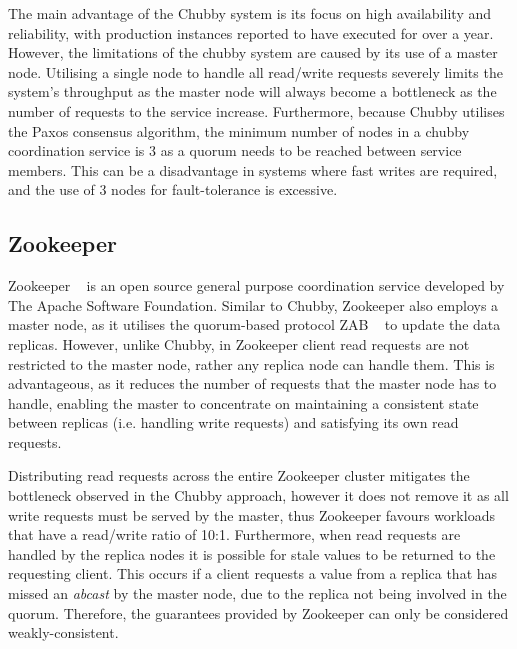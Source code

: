 The main advantage of the Chubby system is its focus on high availability and reliability, with production instances reported to have executed for over a year. However, the limitations of the chubby system are caused by its use of a master node. Utilising a single node to handle all read/write requests severely limits the system's throughput as the master node will always become a bottleneck as the number of requests to the service increase.  Furthermore, because Chubby utilises the Paxos consensus algorithm, the minimum number of nodes in a chubby coordination service is 3 as a quorum needs to be reached between service members.  This can be a disadvantage in systems where fast writes are required, and the use of 3 nodes for fault-tolerance is excessive.  

	\subsection{Zookeeper}
	Zookeeper ~\cite{Hunt:2010:ZWC:1855840.1855851} is an open source general purpose coordination service developed by The Apache Software Foundation. Similar to Chubby, Zookeeper also employs a master node, as it utilises the quorum-based protocol ZAB ~\cite{Junqueira:2011:ZHB:2056308.2056409} to update the data replicas.  However, unlike Chubby, in Zookeeper client read requests are not restricted to the master node, rather any replica node can handle them.  This is advantageous, as it reduces the number of requests that the master node has to handle, enabling the master to concentrate on maintaining a consistent state between replicas (i.e. handling write requests) and satisfying its own read requests.  
	
	Distributing read requests across the entire Zookeeper cluster mitigates the bottleneck observed in the Chubby approach, however it does not remove it as all write requests must be served by the master, thus Zookeeper favours workloads that have a read/write ratio of 10:1. Furthermore, when read requests are handled by the replica nodes it is possible for stale values to be returned to the requesting client.  This occurs if a client requests a value from a replica that has missed an \emph{abcast} by the master node, due to the replica not being involved in the quorum.  Therefore, the guarantees provided by Zookeeper can only be considered weakly-consistent.   


